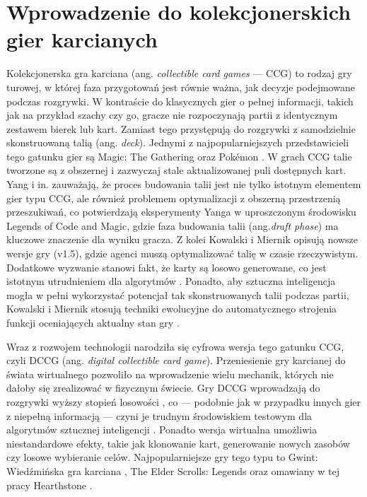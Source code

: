\section{Wprowadzenie do kolekcjonerskich gier karcianych}
Kolekcjonerska gra karciana (ang. \textit{collectible card games} --- CCG) to rodzaj gry turowej, w której faza przygotowań jest równie ważna, jak decyzje podejmowane podczas rozgrywki. W kontraście do klasycznych gier o pełnej informacji, takich jak na przykład szachy czy go, gracze nie rozpoczynają partii z identycznym zestawem bierek lub kart. Zamiast tego przystępują do rozgrywki z samodzielnie skonstruowaną talią (ang. \textit{deck}). Jednymi z najpopularniejszych przedstawicieli tego gatunku gier są Magic: The Gathering \cite{churchill2019} oraz Pokémon \cite{guimaraes2026}. W grach CCG talie tworzone są z obszernej i zazwyczaj stale aktualizowanej puli dostępnych kart. Yang i in. zauważają, że proces budowania talii jest nie tylko istotnym elementem gier typu CCG, ale również problemem optymalizacji z obszerną przestrzenią przeszukiwań, co potwierdzają eksperymenty Yanga w uproszczonym środowisku Legends of Code and Magic, gdzie faza budowania talii (ang.\textit{draft phase}) ma kluczowe znaczenie dla wyniku gracza\cite{yang2021}. Z kolei Kowalski i Miernik opisują nowsze wersje gry (v1.5), gdzie agenci muszą optymalizować talię w czasie rzeczywistym. Dodatkowe wyzwanie stanowi fakt, że karty są losowo generowane, co jest istotnym utrudnieniem dla algorytmów \cite{kowalski2023}. Ponadto, aby sztuczna inteligencja mogła w pełni wykorzystać potencjał tak skonstruowanych talii podczas partii, Kowalski i Miernik stosują techniki ewolucyjne do automatycznego strojenia funkcji oceniających aktualny stan gry \cite{Kowalski2021}.

Wraz z rozwojem technologii narodziła się cyfrowa wersja tego gatunku CCG, czyli DCCG (ang. \textit{digital collectible card game}). Przeniesienie gry karcianej do świata wirtualnego pozwoliło na wprowadzenie wielu mechanik, których nie dałoby się zrealizować w fizycznym świecie. Gry DCCG wprowadzają do rozgrywki wyższy stopień losowości \cite{hoover2020, xue2016}, co --- podobnie jak w przypadku innych gier z niepełną informacją \cite{Luo2026} --- czyni je trudnym środowiskiem testowym dla algorytmów sztucznej inteligencji \cite{Vieira2022}. Ponadto wersja wirtualna umożliwia niestandardowe efekty, takie jak klonowanie kart, generowanie nowych zasobów czy losowe wybieranie celów. Najpopularniejsze gry tego typu to Gwint: Wiedźmińska gra karciana \cite{kominiarczuk2017}, The Elder Scrolls: Legends \cite{vieira2024} oraz omawiany w tej pracy Hearthstone \cite{sanchez2020}.
